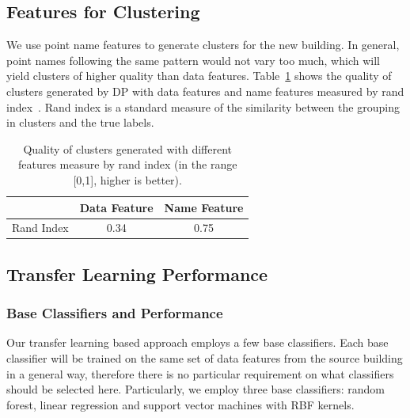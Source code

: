 \subsection{Features for Clustering}
We use point name features to generate clusters for the new building. In general, point names following the same pattern would not vary too much, which will yield clusters of higher quality than data features.
Table~\ref{quality} shows the quality of clusters generated by DP with data features and name features measured by rand index~\cite{rand}. Rand index is a standard measure of the similarity between the grouping in clusters and the true labels.

\begin{table}[h]
\centering
\begin{tabular}{l|c|c}
\hline
                & Data Feature & Name Feature \\ \hline
Rand Index & 0.34       & 0.75       \\ \hline
\end{tabular}
\caption{Quality of clusters generated with different features measure by rand index (in the range [0,1], higher is better).}
\label{quality}
\end{table}

\subsection{Transfer Learning Performance}
\subsubsection{Base Classifiers and Performance}
\label{sec:baseline}
Our transfer learning based approach employs a few base classifiers. Each base classifier will be trained on the same set of data features from the source building in a general way, therefore there is no particular requirement on what classifiers should be selected here.
Particularly, we employ three base classifiers: random forest, linear regression and support vector machines with RBF kernels.


